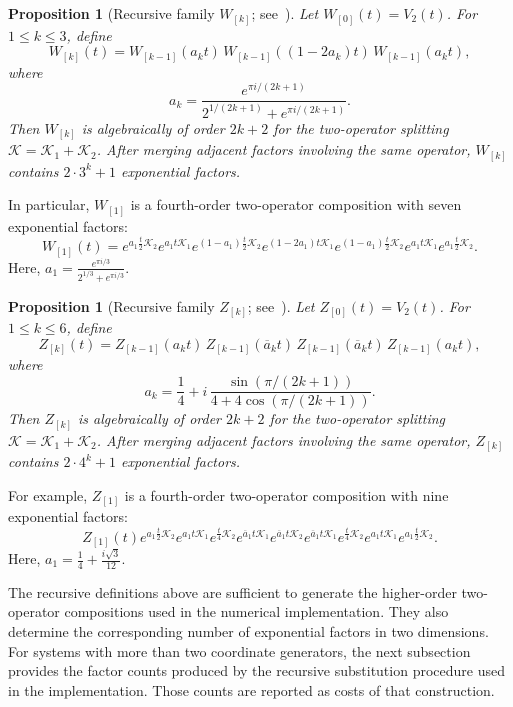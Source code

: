 \documentclass[preprint,1p,times,nopreprintline]{elsarticle}
\newtheorem{proposition}[theorem]{Proposition}
\begin{document}
\begin{proposition}[Recursive family $W_{[k]}$; see~\citet{JD6}]
\label{SplitW}
Let $W_{[0]}(t)=V_2(t)$. For $1\le k\le 3$, define
\begin{equation}
\label{HO53}
W_{[k]}(t)
=
W_{[k-1]}(a_k t)\,
W_{[k-1]}((1-2a_k)t)\,
W_{[k-1]}(a_k t),
\end{equation}
where
\[
a_k
=
\frac{e^{\pi i/(2k+1)}}
{2^{1/(2k+1)}+e^{\pi i/(2k+1)}} .
\]
Then $W_{[k]}$ is algebraically of order $2k+2$ for the two-operator splitting
$\mathcal{K}=\mathcal{K}_1+\mathcal{K}_2$. After merging adjacent factors involving the same operator, $W_{[k]}$ contains $2\cdot 3^k+1$ exponential factors.
\end{proposition}

In particular, $W_{[1]}$ is a fourth-order two-operator composition with seven exponential factors:
\[
W_{[1]}(t)
=
e^{a_1\frac{t}{2}\mathcal{K}_2}
e^{a_1t\mathcal{K}_1}
e^{(1-a_1)\frac{t}{2}\mathcal{K}_2}
e^{(1-2a_1)t\mathcal{K}_1}
e^{(1-a_1)\frac{t}{2}\mathcal{K}_2}
e^{a_1t\mathcal{K}_1}
e^{a_1\frac{t}{2}\mathcal{K}_2}.
\]
Here,
$
a_1
=
\frac{e^{\pi i/3}}
{2^{1/3}+e^{\pi i/3}}$.

\begin{proposition}[Recursive family $Z_{[k]}$; see~\citet{JD6}]
\label{SplitZ}
Let $Z_{[0]}(t)=V_2(t)$. For $1\le k\le 6$, define
\begin{equation}
\label{HO533}
Z_{[k]}(t)
=
Z_{[k-1]}(a_k t)\,
Z_{[k-1]}(\overline{a}_k t)\,
Z_{[k-1]}(\overline{a}_k t)\,
Z_{[k-1]}(a_k t),
\end{equation}
where
\[
a_k
=
\frac{1}{4}
+
i\,
\frac{\sin(\pi/(2k+1))}
{4+4\cos(\pi/(2k+1))}.
\]
Then $Z_{[k]}$ is algebraically of order $2k+2$ for the two-operator splitting
$\mathcal{K}=\mathcal{K}_1+\mathcal{K}_2$. After merging adjacent factors involving the same operator, $Z_{[k]}$ contains $2\cdot 4^k+1$ exponential factors.
\end{proposition}

For example, $Z_{[1]}$ is a fourth-order two-operator composition with nine exponential factors:
\[
Z_{[1]}(t)
e^{a_1\frac{t}{2}\mathcal{K}_2}
e^{a_1t\mathcal{K}_1}
e^{\frac{t}{4}\mathcal{K}_2}
e^{\overline{a}_1t\mathcal{K}_1}
e^{\overline{a}_1t\mathcal{K}_2}
e^{\overline{a}_1t\mathcal{K}_1}
e^{\frac{t}{4}\mathcal{K}_2}
e^{a_1t\mathcal{K}_1}
e^{a_1\frac{t}{2}\mathcal{K}_2}.
\]
Here, $a_1=\frac{1}{4}+\frac{i\sqrt{3}}{12}$.

The recursive definitions above are sufficient to generate the higher-order two-operator compositions used in the numerical implementation. They also determine the corresponding number of exponential factors in two dimensions. For systems with more than two coordinate generators, the next subsection provides the factor counts produced by the recursive substitution procedure used in the implementation. Those counts are reported as costs of that construction.
\end{document}
